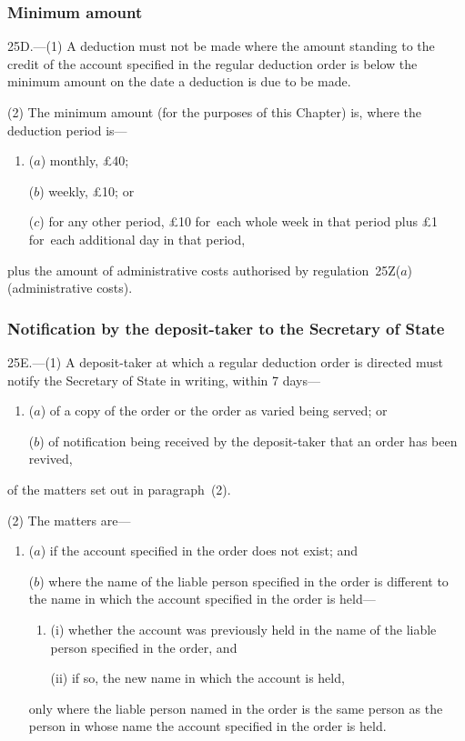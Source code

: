 \documentclass[12pt,a4paper]{article}
\begin{document}
\subsubsection[25D. Minimum amount]{Minimum amount}

25D.---(1)  A deduction must not be made where the amount standing to the credit of the account specified in the regular deduction order is below the minimum amount on the date a deduction is due to be made.

(2) The minimum amount (for the purposes of this Chapter) is, where the deduction period is—
\begin{enumerate}\item[]
($a$) monthly, £40;

($b$) weekly, £10; or

($c$) for any other period, £10 for~each whole week in that period plus £1 for~each additional day in that period,
\end{enumerate}
plus the amount of administrative costs authorised by regulation~25Z($a$)  (administrative costs).

\subsubsection[25E. Notification by the deposit-taker to the 
Secretary of State%
]{Notification by the deposit-taker to the 
Secretary of State%
}

25E.---(1)  A deposit-taker at which a regular deduction order is directed must notify the 
Secretary of State  %
in writing, within 7 days—
\begin{enumerate}\item[]
($a$) of a copy of the order or the order as varied being served; or

($b$) of notification being received by the deposit-taker that an order has been revived,
\end{enumerate}
of the matters set out in paragraph~(2).

(2) The matters are—
\begin{enumerate}\item[]
($a$) if the account specified in the order does not exist; and

($b$) where the name of the liable person specified in the order is different to the name in which the account specified in the order is held—
\begin{enumerate}\item[]
(i) whether the account was previously held in the name of the liable person specified in the order, and

(ii) if so, the new name in which the account is held,
\end{enumerate}
only where the liable person named in the order is the same person as the person in whose name the account specified in the order is held.
\end{enumerate}
\end{document}

